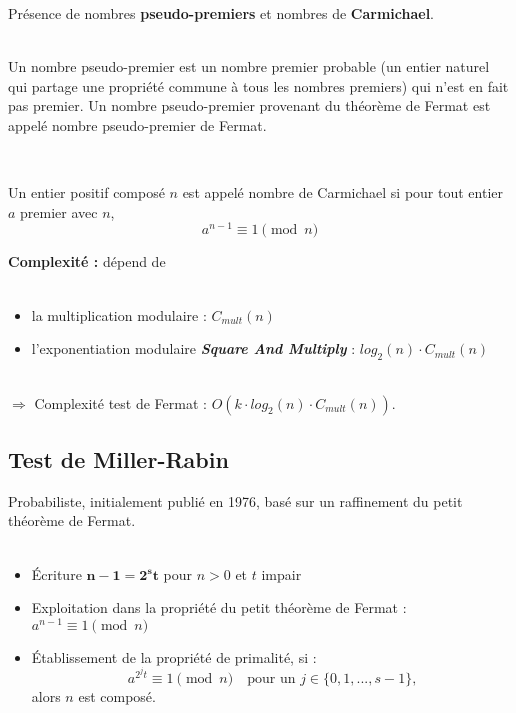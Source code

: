 			\begin{frame}
				Présence de nombres \textbf{pseudo-premiers} et nombres de \textbf{Carmichael}.\\~\\
				\begin{Def}
					\label{PseudoPrem}
					Un nombre pseudo-premier est un nombre premier probable (un entier naturel qui partage une propriété commune à tous les nombres premiers) qui n'est en fait pas premier. Un nombre pseudo-premier provenant du théorème de Fermat est appelé nombre pseudo-premier de Fermat.
				\end{Def}
				~\\
				\begin{Def}
					\label{Carmich}
					Un entier positif composé $n$ est appelé nombre de Carmichael si pour tout entier $a$ premier avec $n$,
					\[a^{n-1}\equiv 1 \pmod n\]
				\end{Def}
			\end{frame}
			
			\begin{frame}
				\textbf{Complexité :} dépend de \\~\\
				\begin{itemize}
				\item la multiplication modulaire : $C_{mult}(n)$
				\item l'exponentiation modulaire \textbf{\textit{Square And Multiply}} : $log_{2}(n) \cdot C_{mult}(n)$
				\end{itemize}
				~\\
				$\Longrightarrow$ Complexité test de Fermat : $O(k \cdot log_{2}(n) \cdot C_{mult}(n))$.
			\end{frame}
		
		\subsection{Test de Miller-Rabin}
			\begin{frame}
			Probabiliste, initialement publié en 1976, basé sur un raffinement du petit théorème de Fermat.\\~\\
			\begin{itemize}
				\item Écriture $\mathbf{n - 1 = 2^{s}t}$ pour $n>0$ et $t$ impair
				\item Exploitation dans la propriété du petit théorème de Fermat : $a^{n-1}\equiv 1 \pmod n$
				\item Établissement de la propriété de primalité, si :
				\[ a^{2^{j}t} \equiv 1 \pmod n \quad \text{pour un } j \in \{0, 1, ..., s-1\} \text{,}\]
				alors $n$ est composé.
			\end{itemize}
			\end{frame}
			
